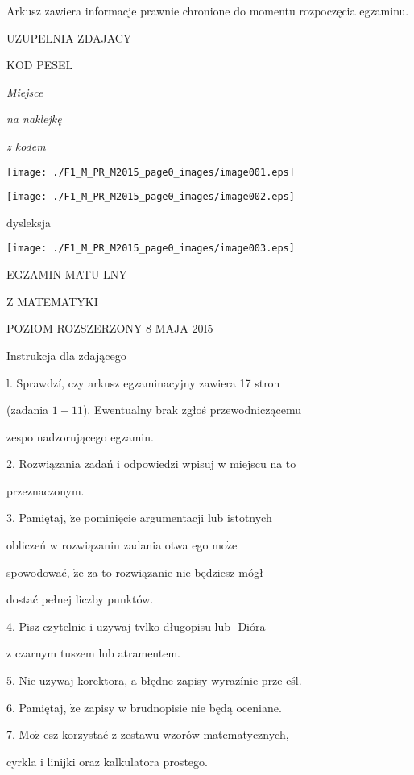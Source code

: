 \documentclass[a4paper,12pt]{article}
\begin{document}
Arkusz zawiera informacje prawnie chronione do momentu rozpoczęcia egzaminu.

UZUPELNIA ZDAJACY

KOD PESEL

{\it Miejsce}

{\it na naklejkę}

{\it z kodem}
\begin{center}
\texttt{[image: ./F1\_M\_PR\_M2015\_page0\_images/image001.eps]}

\texttt{[image: ./F1\_M\_PR\_M2015\_page0\_images/image002.eps]}
\end{center}
\fbox{} dysleksja
\begin{center}
\texttt{[image: ./F1\_M\_PR\_M2015\_page0\_images/image003.eps]}
\end{center}
EGZAMIN MATU LNY

Z MATEMATYKI

POZIOM ROZSZERZONY  8 MAJA 20I5

Instrukcja dla zdającego

l. Sprawdzí, czy arkusz egzaminacyjny zawiera 17 stron

(zadania $1-11$). Ewentualny brak zgłoś przewodniczącemu

zespo nadzorującego egzamin.

2. Rozwiązania zadań i odpowiedzi wpisuj w miejscu na to

przeznaczonym.

3. Pamiętaj, $\dot{\mathrm{z}}\mathrm{e}$ pominięcie argumentacji lub istotnych

obliczeń w rozwiązaniu zadania otwa ego $\mathrm{m}\mathrm{o}\dot{\mathrm{z}}\mathrm{e}$

spowodować, $\dot{\mathrm{z}}\mathrm{e}$ za to rozwiązanie nie będziesz mógł

dostać pełnej liczby punktów.

4. Pisz czytelnie i uzywaj tvlko długopisu lub -Dióra

z czarnym tuszem lub atramentem.

5. Nie uzywaj korektora, a błędne zapisy wyrazínie prze eśl.

6. Pamiętaj, $\dot{\mathrm{z}}\mathrm{e}$ zapisy w brudnopisie nie będą oceniane.

7. $\mathrm{M}\mathrm{o}\dot{\mathrm{z}}$ esz korzystać z zestawu wzorów matematycznych,

cyrkla i linijki oraz kalkulatora prostego.
\end{document}
